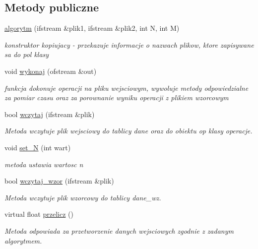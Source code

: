 \subsection*{Metody publiczne}
\begin{DoxyCompactItemize}
\item 
\hyperlink{classalgorytm_af51409bfda664789d3a970bb0aa91f41}{algorytm} (ifstream \&plik1, ifstream \&plik2, int N, int M)
\begin{DoxyCompactList}\small\item\em konstruktor kopiujacy -\/ przekazuje informacje o nazwach plikow, ktore zapisywane sa do pol klasy \end{DoxyCompactList}\item 
void \hyperlink{classalgorytm_a0264787ff113740826ef1368d98dd019}{wykonaj} (ofstream \&out)
\begin{DoxyCompactList}\small\item\em funkcja dokonuje operacji na pliku wejsciowym, wywoluje metody odpowiedzialne za pomiar czasu oraz za porownanie wyniku operacji z plikiem wzorcowym \end{DoxyCompactList}\item 
bool \hyperlink{classalgorytm_aa12f93ae34e49251044a72fd76ce3ebb}{wczytaj} (ifstream \&plik)
\begin{DoxyCompactList}\small\item\em Metoda wczytuje plik wejsciowy do tablicy {\ttfamily dane} oraz do obiektu {\ttfamily op} klasy {\ttfamily operacje}. \end{DoxyCompactList}\item 
void \hyperlink{classalgorytm_a006ea8d2296b419f128fb936bad49c50}{set\-\_\-\-N} (int wart)
\begin{DoxyCompactList}\small\item\em metoda ustawia wartosc n \end{DoxyCompactList}\item 
bool \hyperlink{classalgorytm_abf132ac5055b185a380f1285a29f75fd}{wczytaj\-\_\-wzor} (ifstream \&plik)
\begin{DoxyCompactList}\small\item\em Metoda wczytuje plik wzorcowy do tablicy {\ttfamily dane\-\_\-wz}. \end{DoxyCompactList}\item 
virtual float \hyperlink{classalgorytm_af3f92bf537b1f2e1f93173983e838449}{przelicz} ()
\begin{DoxyCompactList}\small\item\em Metoda odpowiada za przetworzenie danych wejsciowych zgodnie z zadanym algorytmem. \end{DoxyCompactList}\item 

\end{DoxyCompactItemize}
